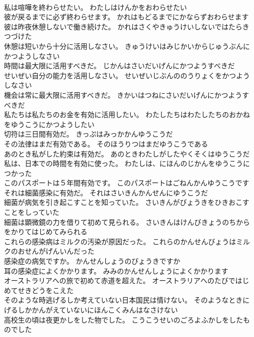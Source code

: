 \documentclass[8pt]{extreport}
\begin{document}
\begin{CJK}{UTF8}{min}
\\	私は喧嘩を終わらせたい。	わたしはけんかをおわらせたい 
\\	彼が戻るまでに必ず終わらせます。	かれはもどるまでにかならずおわらせます 
\\	彼は昨夜休憩しないで働き続けた。	かれはさくやきゅうけいしないではたらきつづけた 
\\	休憩は短いから十分に活用しなさい。	きゅうけいはみじかいからじゅうぶんにかつようしなさい 
\\	時間は最大限に活用すべきだ。	じかんはさいだいげんにかつようすべきだ 
\\	せいぜい自分の能力を活用しなさい。	せいぜいじぶんののうりょくをかつようしなさい 
\\	機会は常に最大限に活用すべきだ。	きかいはつねにさいだいげんにかつようすべきだ 
\\	私たちは私たちのお金を有効に活用したい。	わたしたちはわたしたちのおかねをゆうこうにかつようしたい 
\\	切符は三日間有効だ。	きっぷはみっかかんゆうこうだ 
\\	その法律はまだ有効である。	そのほうりつはまだゆうこうである 
\\	あのとき私がした約束は有効だ。	あのときわたしがしたやくそくはゆうこうだ 
\\	私は、日本での時間を有効に使った。	わたしは、にほんのじかんをゆうこうにつかった 
\\	このパスポートは５年間有効です。	このパスポートはごねんかんゆうこうです 
\\	それは細菌感染に有効だ。	それはさいきんかんせんにゆうこうだ 
\\	細菌が病気を引き起こすことを知っていた。	さいきんがびょうきをひきおこすことをしっていた 
\\	細菌は顕微鏡の力を借りて初めて見られる。	さいきんはけんびきょうのちからをかりてはじめてみられる 
\\	これらの感染病はミルクの汚染が原因だった。	これらのかんせんびょうはミルクのおせんがげんいんだった 
\\	感染症の病気ですか。	かんせんしょうのびょうきですか 
\\	耳の感染症によくかかります。	みみのかんせんしょうによくかかります 
\\	オーストラリアへの旅で初めて赤道を超えた。	オーストラリアへのたびではじめてせきどうをこえた 
\\	そのような時逃げるしか考えていない日本国民は情けない。	そのようなときにげるしかかんがえていないにほんこくみんはなさけない 
\\	高校生の頃は夜更かしをした物でした。	こうこうせいのごろよふかしをしたものでした 

\end{CJK}
\end{document}
